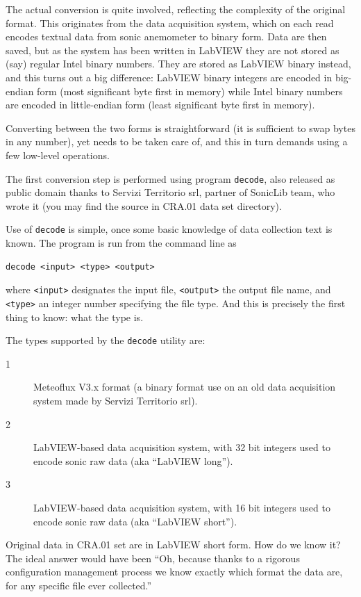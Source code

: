 \documentclass[a4paper,10pt]{book}
\begin{document}
The actual conversion is quite involved, reflecting the complexity of the original format. This originates from the data acquisition system, which on each read encodes textual data from sonic anemometer to binary form. Data are then saved, but as the system has been written in LabVIEW they are not stored as (say) regular Intel binary numbers. They are stored as LabVIEW binary instead, and this turns out a big difference: LabVIEW binary integers are encoded in big-endian form (most significant byte first in memory) while Intel binary numbers are encoded in little-endian form (least significant byte first in memory). 

Converting between the two forms is straightforward (it is sufficient to swap bytes in any number), yet needs to be taken care of, and this in turn demands using a few low-level operations.

The first conversion step is performed using program \verb|decode|, also released as public domain thanks to Servizi Territorio srl, partner of SonicLib team, who wrote it (you may find the source in CRA.01 data set directory).

Use of \verb|decode| is simple, once some basic knowledge of data collection text is known. The program is run from the command line as

\begin{verbatim}
decode <input> <type> <output>
\end{verbatim}

\noindent where \verb|<input>| designates the input file, \verb|<output>| the output file name, and \verb|<type>| an integer number specifying the file type. And this is precisely the first thing to know: what the type is.

The types supported by the \verb|decode| utility are:

\begin{description}
 \item[1] Meteoflux V3.x format (a binary format use on an old data acquisition system made by Servizi Territorio srl).
 \item[2] LabVIEW-based data acquisition system, with 32 bit integers used to encode sonic raw data (aka ``LabVIEW long'').
 \item[3] LabVIEW-based data acquisition system, with 16 bit integers used to encode sonic raw data (aka ``LabVIEW short'').
\end{description}

Original data in CRA.01 set are in LabVIEW short form. How do we know it? The ideal answer would have been ``Oh, because thanks to a rigorous configuration management process we know exactly which format the data are, for any specific file ever collected.''
\end{document}
